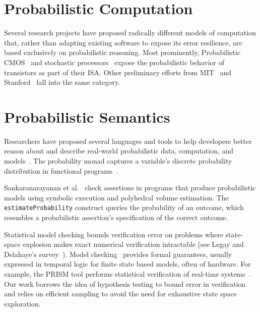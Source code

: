\section{Probabilistic Computation}

Several research projects have proposed radically different models of
computation that, rather than adapting existing software to expose its error
resilience, are based exclusively on probabilistic reasoning. Most
prominently, Probabilistic CMOS~\cite{pcmos, pcmos-cacm, palem-dac-position}
and stochastic processors~\cite{stochasticproc, storm} expose the probabilistic
behavior of transistors as part of their ISA.
Other preliminary efforts from MIT~\cite{batesmit, lyric, mansinghka-circuits} and
Stanford~\cite{ersa} fall into the same category.

\section{Probabilistic Semantics}

Researchers have proposed several languages and tools to
help developers better reason about and describe real-world
probabilistic data, computation, and models~\cite{BBGR13,
  wingate-lightweight, church, chaganty, pfeffersample, pmonad,
  infernet, probdsl,uncertaint}.
The probability monad captures a variable's discrete probability
distribution in functional programs~\cite{pmonad}.

Sankaranarayanan et al.~\cite{sriram-pldi} check assertions in
programs that produce probabilistic models using symbolic execution
and polyhedral volume estimation. The \texttt{estimateProbability} construct
queries the probability of an outcome, which resembles a probabilistic
assertion's
specification of the correct outcome.

Statistical model checking bounds verification error on
problems where state-space explosion makes exact numerical
verification intractable (see Legay and Delahaye's
survey~\cite{legay10}).  Model checking~\cite{Clarke} provides formal guarantees,
usually expressed in temporal logic for finite state
based models, often of hardware. For example, the
PRISM tool performs statistical verification of real-time
systems~\cite{KNP11}. Our work borrows the idea of hypothesis
testing to bound error in verification~\cite{Younes,Younes20061368}
and
relies on efficient sampling to avoid
the need for exhaustive state space exploration.

